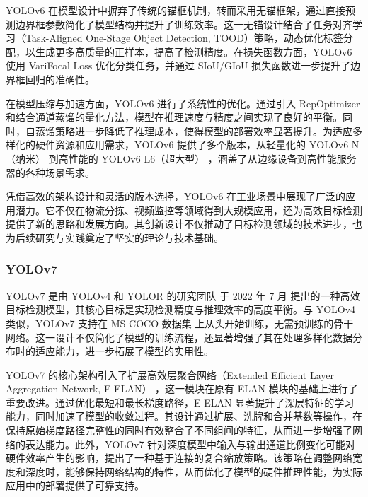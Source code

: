 \documentclass[11pt,twocolumn]{ctexart}
\begin{document}
YOLOv6 在模型设计中摒弃了传统的锚框机制，转而采用无锚框架，通过直接预测边界框参数简化了模型结构并提升了训练效率。这一无锚设计结合了任务对齐学习（Task-Aligned One-Stage Object Detection, TOOD）\cite{feng2021tood}策略，动态优化标签分配，以生成更多高质量的正样本，提高了检测精度。在损失函数方面，YOLOv6 使用 VariFocal Loss 优化分类任务，并通过 SIoU/GIoU 损失函数进一步提升了边界框回归的准确性。

在模型压缩与加速方面，YOLOv6 进行了系统性的优化。通过引入 RepOptimizer 和结合通道蒸馏的量化方法，模型在推理速度与精度之间实现了良好的平衡。同时，自蒸馏策略进一步降低了推理成本，使得模型的部署效率显著提升。为适应多样化的硬件资源和应用需求，YOLOv6 提供了多个版本，从轻量化的 YOLOv6-N（纳米） 到高性能的 YOLOv6-L6（超大型） ，涵盖了从边缘设备到高性能服务器的各种场景需求。


凭借高效的架构设计和灵活的版本选择，YOLOv6 在工业场景中展现了广泛的应用潜力。它不仅在物流分拣、视频监控等领域得到大规模应用，还为高效目标检测提供了新的思路和发展方向。其创新设计不仅推动了目标检测领域的技术进步，也为后续研究与实践奠定了坚实的理论与技术基础。
\subsubsection{YOLOv7}
YOLOv7\cite{wang2023yolov7} 是由 YOLOv4 和 YOLOR 的研究团队 于 2022 年 7 月 提出的一种高效目标检测模型，其核心目标是实现检测精度与推理效率的高度平衡。与 YOLOv4 类似，YOLOv7 支持在 MS COCO 数据集 上从头开始训练，无需预训练的骨干网络。这一设计不仅简化了模型的训练流程，还显著增强了其在处理多样化数据分布时的适应能力，进一步拓展了模型的实用性。

YOLOv7 的核心架构引入了扩展高效层聚合网络（Extended Efficient Layer Aggregation Network, E-ELAN） ，这一模块在原有 ELAN 模块的基础上进行了重要改进。通过优化最短和最长梯度路径，E-ELAN 显著提升了深层特征的学习能力，同时加速了模型的收敛过程。其设计通过扩展、洗牌和合并基数等操作，在保持原始梯度路径完整性的同时有效整合了不同组间的特征，从而进一步增强了网络的表达能力。此外，YOLOv7 针对深度模型中输入与输出通道比例变化可能对硬件效率产生的影响，提出了一种基于连接的复合缩放策略。该策略在调整网络宽度和深度时，能够保持网络结构的特性，从而优化了模型的硬件推理性能，为实际应用中的部署提供了可靠支持。
\end{document}
